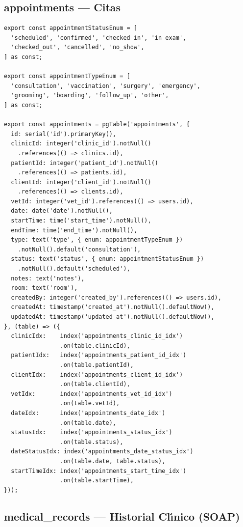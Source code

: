 \subsection{appointments --- Citas}

\begin{lstlisting}[style=typescript, caption=Esquema appointments]
export const appointmentStatusEnum = [
  'scheduled', 'confirmed', 'checked_in', 'in_exam',
  'checked_out', 'cancelled', 'no_show',
] as const;

export const appointmentTypeEnum = [
  'consultation', 'vaccination', 'surgery', 'emergency',
  'grooming', 'boarding', 'follow_up', 'other',
] as const;

export const appointments = pgTable('appointments', {
  id: serial('id').primaryKey(),
  clinicId: integer('clinic_id').notNull()
    .references(() => clinics.id),
  patientId: integer('patient_id').notNull()
    .references(() => patients.id),
  clientId: integer('client_id').notNull()
    .references(() => clients.id),
  vetId: integer('vet_id').references(() => users.id),
  date: date('date').notNull(),
  startTime: time('start_time').notNull(),
  endTime: time('end_time').notNull(),
  type: text('type', { enum: appointmentTypeEnum })
    .notNull().default('consultation'),
  status: text('status', { enum: appointmentStatusEnum })
    .notNull().default('scheduled'),
  notes: text('notes'),
  room: text('room'),
  createdBy: integer('created_by').references(() => users.id),
  createdAt: timestamp('created_at').notNull().defaultNow(),
  updatedAt: timestamp('updated_at').notNull().defaultNow(),
}, (table) => ({
  clinicIdx:    index('appointments_clinic_id_idx')
                .on(table.clinicId),
  patientIdx:   index('appointments_patient_id_idx')
                .on(table.patientId),
  clientIdx:    index('appointments_client_id_idx')
                .on(table.clientId),
  vetIdx:       index('appointments_vet_id_idx')
                .on(table.vetId),
  dateIdx:      index('appointments_date_idx')
                .on(table.date),
  statusIdx:    index('appointments_status_idx')
                .on(table.status),
  dateStatusIdx: index('appointments_date_status_idx')
                .on(table.date, table.status),
  startTimeIdx: index('appointments_start_time_idx')
                .on(table.startTime),
}));
\end{lstlisting}

\subsection{medical\_records --- Historial Cl\'{\i}nico (SOAP)}

